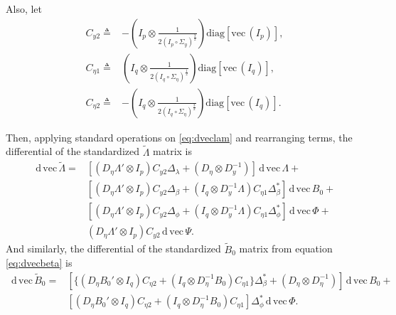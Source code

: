 \documentclass[a4paper, 11pt]{article}
\newcommand{\n}{\eta}
\renewcommand{\l}{\lambda}
\renewcommand{\b}{\beta}
\newcommand{\p}{\phi}
\renewcommand{\d}{\,\mathrm{d}\,}
\newcommand{\definedas}{\triangleq}
\newcommand{\kronprod}{\otimes}
\newcommand{\hadaprod}{\circ}
\newcommand{\diag}{\mathrm{diag}}
\renewcommand{\vec}{\mathrm{vec}\,}
\newcommand{\Lambdastan}{\tilde{\Lambda}}
\newcommand{\Bstan}{\tilde{B}}
\newcommand{\0}{\boldsymbol{0}}
\begin{document}
Also, let
\begin{align}
    C_{y2} \definedas&
        - (I_p \kronprod \frac{1}{2 (I_p \hadaprod \Sigma_y)^{\frac{3}{2}}})
        \diag[\vec(I_p)],
\\
    C_{\n1} \definedas&
        (I_q \kronprod \frac{1}{2 (I_q \hadaprod \Sigma_\n)^{\frac{1}{2}}})
        \diag[\vec(I_q)],
\\
    C_{\n2} \definedas&
        - (I_q \kronprod \frac{1}{2 (I_q \hadaprod \Sigma_\n)^{\frac{3}{2}}})
        \diag[\vec(I_q)].
\end{align}

Then, applying standard operations on \ref{eq:dveclam} and rearranging terms,
the differential of the standardized $\Lambdastan$ matrix is
\begin{equation}\label{eq:dveclam_final}
\begin{split}
  \d\vec\Lambdastan = 
     & [(D_\n \Lambda' \kronprod I_p) C_{y2} \Delta_\l + 
        (D_\n \kronprod D_y^{-1})] 
        \d\vec\Lambda +\\
     & [(D_\n \Lambda' \kronprod I_p) C_{y2} \Delta_\b + 
        (I_q \kronprod D_y^{-1}\Lambda) C_{\n1} \Delta^*_\b ] 
        \d\vec B_0 +\\
     & [(D_\n \Lambda' \kronprod I_p) C_{y2} \Delta_\p + 
        (I_q \kronprod D_y^{-1}\Lambda) C_{\n1} \Delta^*_\p ] 
        \d\vec \Phi +\\
     & (D_\n \Lambda' \kronprod I_p) C_{y2} 
        \d\vec \Psi.
\end{split}\end{equation}
And similarly, the differential of the standardized $\Bstan_0$ matrix from
equation \ref{eq:dvecbeta} is
\begin{equation}\label{eq:dvecbeta_final}
\begin{split}
  \d\vec \Bstan_0 =
     & [\{(D_\n B_0' \kronprod I_q) C_{\n2}  + 
        (I_q \kronprod D_\n^{-1}B_0) C_{\n1} \} \Delta^*_\b +
           (D_\n \kronprod D_\n^{-1})  ] 
        \d\vec B_0 +\\
     & [(D_\n B_0' \kronprod I_q) C_{\n2}  + 
        (I_q \kronprod D_\n^{-1}B_0) C_{\n1} ] \Delta^*_\p 
        \d\vec \Phi.
\end{split}\end{equation}
\end{document}
